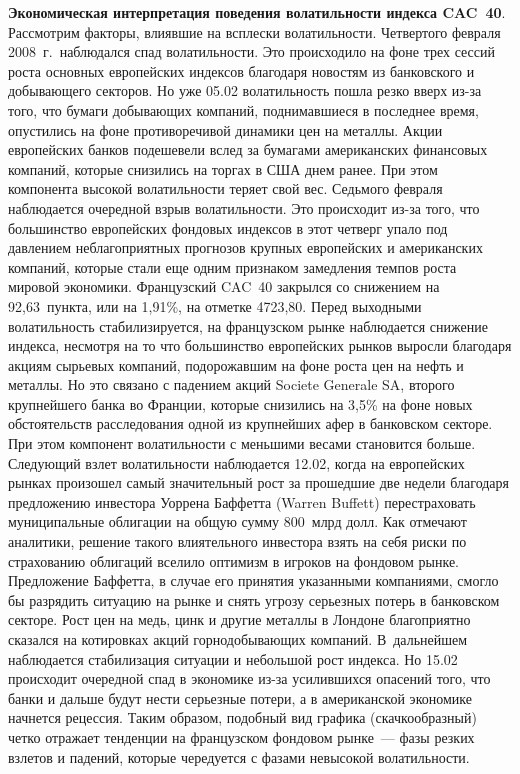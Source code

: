 \begin{multicols}{2}
{\bf Экономическая интерпретация поведения волатильности индекса
CAC~40}. Рассмотрим факторы, влиявшие на всплески волатильности.
Четвертого февраля 2008~г.\ наблюдался спад волатильности. Это происходило
на фоне трех сессий роста основных европейских индексов благодаря
новостям из банковского и добывающего секторов. Но уже 05.02
волатильность пошла резко вверх из-за того, что бумаги добывающих
компаний, поднимавшиеся в последнее время, опустились на фоне
противоречивой динамики цен на металлы. Акции европейских банков
подешевели вслед за бумагами американских финансовых компаний,
которые снизились на торгах в США днем ранее. При этом компонента
высокой волатильности теряет свой вес. Седьмого февраля наблюдается
очередной взрыв волатильности. Это происходит из-за того, что
большинство европейских фондовых индексов в этот четверг упало под
давлением неблагоприятных прогнозов крупных европейских и
американских компаний, которые стали еще одним признаком
замедления темпов роста мировой экономики. Французский CAC~40
закрылся со снижением на 92,63~пункта, или на 1,91\%, на отметке
4723,80. Перед выходными волатильность стабилизируется, на
французском рынке наблюдается снижение индекса, несмотря на то что
большинство европейских рынков вы\-рос\-ли благодаря акциям сырьевых
компаний, подорожавшим на фоне роста цен на нефть и металлы. Но
это связано с падением акций Societe Generale SA, второго
крупнейшего банка во Франции, которые снизились на 3,5\% на фоне
новых обстоятельств расследования одной из крупнейших афер в
банковском секторе. При этом компонент волатильности с меньшими
весами становится больше. Сле\-ду\-ющий взлет волатильности
наблюдается 12.02, когда на европейских рынках произошел самый
значительный рост за прошедшие две недели благодаря предложению
инвестора Уоррена Баффетта (Warren Buffett) перестраховать
муниципальные облигации на общую сумму 800~млрд долл. Как
отмечают аналитики, решение такого влиятельного инвестора взять на
себя риски по страхованию облигаций вселило оптимизм в игроков на
фондовом рынке. Предложение Баффетта, в случае его принятия
указанными компаниями, смогло бы разрядить ситуацию на рынке и
снять угрозу серьезных потерь в банковском секторе. Рост цен на
медь, цинк и другие металлы в Лондоне благоприятно сказался на
котировках акций горнодобывающих компаний. В~дальнейшем
наблюдается стабилизация ситуации и небольшой рост индекса. Но
15.02 происходит очередной спад в экономике из-за усилившихся
опасений того, что банки и дальше будут нести серьезные потери, а
в американской экономике начнется рецессия. Таким образом,
подобный вид графика (скачкообразный) четко отражает тенденции на
французском фондовом рынке~--- фазы резких взлетов и падений,
которые чередуется с фазами невысокой волатильности.



\end{multicols}
